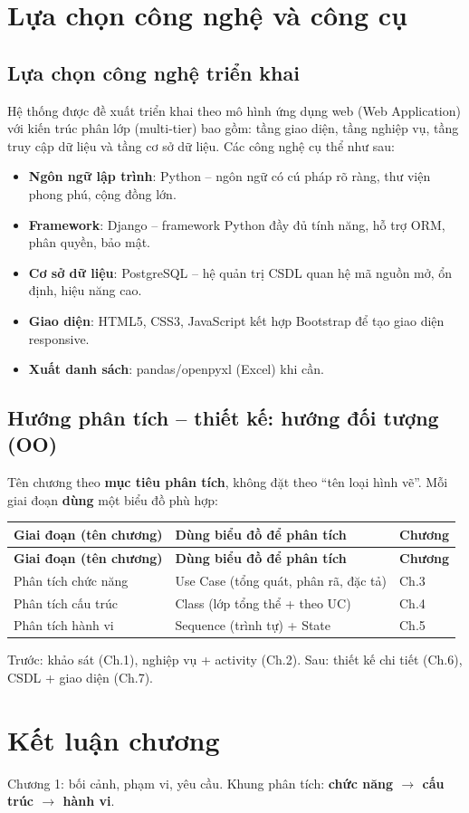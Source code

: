 \section{Lựa chọn công nghệ và công cụ}

\subsection{Lựa chọn công nghệ triển khai}

Hệ thống được đề xuất triển khai theo mô hình ứng dụng web (Web Application) với kiến trúc phân lớp (multi-tier) bao gồm: tầng giao diện, tầng nghiệp vụ, tầng truy cập dữ liệu và tầng cơ sở dữ liệu. Các công nghệ cụ thể như sau:

\begin{itemize}[leftmargin=1.5cm]
    \item \textbf{Ngôn ngữ lập trình}: Python -- ngôn ngữ có cú pháp rõ ràng, thư viện phong phú, cộng đồng lớn.
    \item \textbf{Framework}: Django -- framework Python đầy đủ tính năng, hỗ trợ ORM, phân quyền, bảo mật.
    \item \textbf{Cơ sở dữ liệu}: PostgreSQL -- hệ quản trị CSDL quan hệ mã nguồn mở, ổn định, hiệu năng cao.
    \item \textbf{Giao diện}: HTML5, CSS3, JavaScript kết hợp Bootstrap để tạo giao diện responsive.
    \item \textbf{Xuất danh sách}: pandas/openpyxl (Excel) khi cần.
\end{itemize}

\subsection{Hướng phân tích -- thiết kế: hướng đối tượng (OO)}

Tên chương theo \textbf{mục tiêu phân tích}, không đặt theo ``tên loại hình vẽ''. Mỗi giai đoạn \textbf{dùng} một biểu đồ phù hợp:

\begin{longtable}{|p{4.2cm}|p{5.5cm}|p{3.5cm}|}
\hline
\textbf{Giai đoạn (tên chương)} & \textbf{Dùng biểu đồ để phân tích} & \textbf{Chương} \\
\hline
\endfirsthead
\hline
\textbf{Giai đoạn (tên chương)} & \textbf{Dùng biểu đồ để phân tích} & \textbf{Chương} \\
\hline
\endhead
Phân tích chức năng & Use Case (tổng quát, phân rã, đặc tả) & Ch.3 \\
\hline
Phân tích cấu trúc & Class (lớp tổng thể + theo UC) & Ch.4 \\
\hline
Phân tích hành vi & Sequence (trình tự) + State & Ch.5 \\
\hline
\end{longtable}

Trước: khảo sát (Ch.1), nghiệp vụ + activity (Ch.2). Sau: thiết kế chi tiết (Ch.6), CSDL + giao diện (Ch.7).

\section{Kết luận chương}

Chương 1: bối cảnh, phạm vi, yêu cầu. Khung phân tích: \textbf{chức năng $\rightarrow$ cấu trúc $\rightarrow$ hành vi}.

